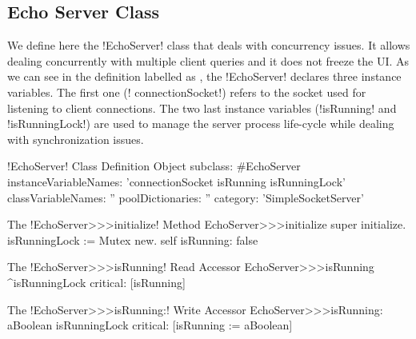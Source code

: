 \documentclass[a4paper,10pt,twoside]{book}
\begin{document}
%

\subsection{Echo Server Class}
We define here the  \ct!EchoServer! class that deals with concurrency issues.
It allows dealing concurrently with multiple client queries and it does not freeze the UI.
As we can see in the definition labelled as , the \ct!EchoServer! declares three instance variables.
The first one (\ct! connectionSocket!) refers to the socket used for listening to client connections.
The two last instance variables (\ct!isRunning! and \ct!isRunningLock!) are used to manage the server process life-cycle while dealing with synchronization issues.
 
\begin{classdef}[echoServerClassDef]{\ct!EchoServer! Class Definition}
Object subclass: #EchoServer
	instanceVariableNames: 'connectionSocket isRunning isRunningLock'
	classVariableNames: ''
	poolDictionaries: ''
	category: 'SimpleSocketServer'
\end{classdef}

\begin{method}{The \ct!EchoServer>>>initialize! Method}
EchoServer>>>initialize 
	super initialize.
	isRunningLock := Mutex new.
	self isRunning: false
\end{method}

\begin{method}{The \ct!EchoServer>>>isRunning! Read Accessor}
EchoServer>>>isRunning
	^isRunningLock critical: [isRunning]
\end{method}

\begin{method}{The \ct!EchoServer>>>isRunning:! Write Accessor}
EchoServer>>>isRunning: aBoolean
	isRunningLock critical: [isRunning := aBoolean]
\end{method}
\end{document}
